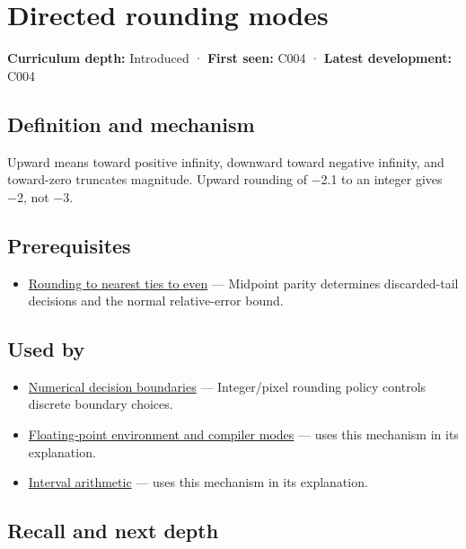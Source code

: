\hypertarget{appendix-637d164ae5ca}{}\label{referencestart:appendix-637d164ae5ca}
\section{Directed rounding modes}\label{appendix-637d164ae5ca-directed-rounding-modes}

\textbf{Curriculum depth:} Introduced · \textbf{First seen:} C004 · \textbf{Latest development:} C004

\subsection{Definition and mechanism}\label{appendix-637d164ae5ca-definition-and-mechanism}

Upward means toward positive infinity, downward toward negative infinity, and toward-zero truncates magnitude. Upward rounding of −2.1 to an integer gives −2, not −3.

\subsection{Prerequisites}\label{appendix-637d164ae5ca-prerequisites}

\begin{itemize}
\tightlist
\item
  \hyperref[appendix-614afe1de592]{Rounding to nearest ties to even} --- Midpoint parity determines discarded-tail decisions and the normal relative-error bound.
\end{itemize}

\subsection{Used by}\label{appendix-637d164ae5ca-used-by}

\begin{itemize}
\item
  \hyperref[appendix-c80db39080be]{Numerical decision boundaries} --- Integer/pixel rounding policy controls discrete boundary choices.
\item
  \hyperref[appendix-f11d1a521253]{Floating-point environment and compiler modes} --- uses this mechanism in its explanation.
\item
  \hyperref[appendix-1823a14330cb]{Interval arithmetic} --- uses this mechanism in its explanation.
\end{itemize}

\subsection{Recall and next depth}\label{appendix-637d164ae5ca-recall-and-next-depth}

